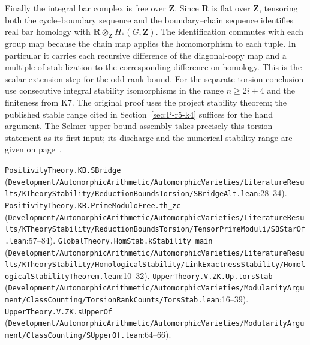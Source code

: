 Finally the integral bar complex is free over $\mathbf Z$. Since $\mathbf R$ is flat over $\mathbf Z$, tensoring both the cycle--boundary sequence and the boundary--chain sequence identifies real bar homology with $\mathbf R\otimes_{\mathbf Z}H_*(G,\mathbf Z)$. The identification commutes with each group map because the chain map applies the homomorphism to each tuple. In particular it carries each recursive difference of the diagonal-copy map and a multiple of stabilization to the corresponding difference on homology. This is the scalar-extension step for the odd rank bound. For the separate torsion conclusion use consecutive integral stability isomorphisms in the range $n\ge 2i+4$ and the finiteness from K7. The original proof uses the project stability theorem; the published stable range cited in Section~\ref{sec:P-r5-k4} suffices for the hand argument. The Selmer upper-bound assembly takes precisely this torsion statement as its first input; its discharge and the numerical stability range are given on page~\pageref{r7:review:Z2.K4}.
\par{\footnotesize \nolinkurl{PositivityTheory.KB.SBridge} (\nolinkurl{Development/AutomorphicArithmetic/AutomorphicVarieties/LiteratureResults/KTheoryStability/ReductionBoundsTorsion/SBridgeAlt.lean}\allowbreak:28--34). \nolinkurl{PositivityTheory.KB.PrimeModuloFree.th_zc} (\nolinkurl{Development/AutomorphicArithmetic/AutomorphicVarieties/LiteratureResults/KTheoryStability/ReductionBoundsTorsion/TensorPrimeModuli/SBStarOf.lean}\allowbreak:57--84). \nolinkurl{GlobalTheory.HomStab.kStability_main} (\nolinkurl{Development/AutomorphicArithmetic/AutomorphicVarieties/LiteratureResults/KTheoryStability/HomologicalStability/LinkExactnessStability/HomologicalStabilityTheorem.lean}\allowbreak:10--32). \nolinkurl{UpperTheory.V.ZK.Up.torsStab} (\nolinkurl{Development/AutomorphicArithmetic/AutomorphicVarieties/ModularityArgument/ClassCounting/TorsionRankCounts/TorsStab.lean}\allowbreak:16--39). \nolinkurl{UpperTheory.V.ZK.sUpperOf} (\nolinkurl{Development/AutomorphicArithmetic/AutomorphicVarieties/ModularityArgument/ClassCounting/SUpperOf.lean}\allowbreak:64--66).\par}

